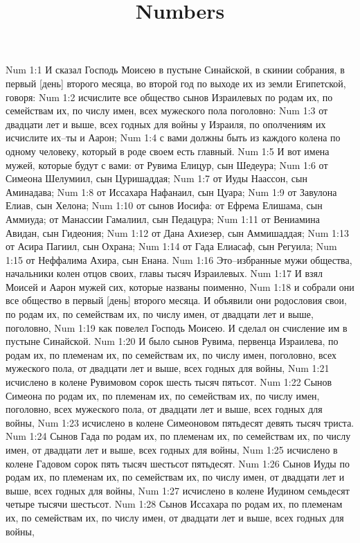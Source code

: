 

\title{Numbers}

Num 1:1  И сказал Господь Моисею в пустыне Синайской, в скинии собрания, в первый [день] второго месяца, во второй год по выходе их из земли Египетской, говоря:
Num 1:2  исчислите все общество сынов Израилевых по родам их, по семействам их, по числу имен, всех мужеского пола поголовно:
Num 1:3  от двадцати лет и выше, всех годных для войны у Израиля, по ополчениям их исчислите их--ты и Аарон;
Num 1:4  с вами должны быть из каждого колена по одному человеку, который в роде своем есть главный.
Num 1:5  И вот имена мужей, которые будут с вами: от Рувима Елицур, сын Шедеура;
Num 1:6  от Симеона Шелумиил, сын Цуришаддая;
Num 1:7  от Иуды Наассон, сын Аминадава;
Num 1:8  от Иссахара Нафанаил, сын Цуара;
Num 1:9  от Завулона Елиав, сын Хелона;
Num 1:10  от сынов Иосифа: от Ефрема Елишама, сын Аммиуда; от Манассии Гамалиил, сын Педацура;
Num 1:11  от Вениамина Авидан, сын Гидеония;
Num 1:12  от Дана Ахиезер, сын Аммишаддая;
Num 1:13  от Асира Пагиил, сын Охрана;
Num 1:14  от Гада Елиасаф, сын Регуила;
Num 1:15  от Неффалима Ахира, сын Енана.
Num 1:16  Это--избранные мужи общества, начальники колен отцов своих, главы тысяч Израилевых.
Num 1:17  И взял Моисей и Аарон мужей сих, которые названы поименно,
Num 1:18  и собрали они все общество в первый [день] второго месяца. И объявили они родословия свои, по родам их, по семействам их, по числу имен, от двадцати лет и выше, поголовно,
Num 1:19  как повелел Господь Моисею. И сделал он счисление им в пустыне Синайской.
Num 1:20  И было сынов Рувима, первенца Израилева, по родам их, по племенам их, по семействам их, по числу имен, поголовно, всех мужеского пола, от двадцати лет и выше, всех годных для войны,
Num 1:21  исчислено в колене Рувимовом сорок шесть тысяч пятьсот.
Num 1:22  Сынов Симеона по родам их, по племенам их, по семействам их, по числу имен, поголовно, всех мужеского пола, от двадцати лет и выше, всех годных для войны,
Num 1:23  исчислено в колене Симеоновом пятьдесят девять тысяч триста.
Num 1:24  Сынов Гада по родам их, по племенам их, по семействам их, по числу имен, от двадцати лет и выше, всех годных для войны,
Num 1:25  исчислено в колене Гадовом сорок пять тысяч шестьсот пятьдесят.
Num 1:26  Сынов Иуды по родам их, по племенам их, по семействам их, по числу имен, от двадцати лет и выше, всех годных для войны,
Num 1:27  исчислено в колене Иудином семьдесят четыре тысячи шестьсот.
Num 1:28  Сынов Иссахара по родам их, по племенам их, по семействам их, по числу имен, от двадцати лет и выше, всех годных для войны,
